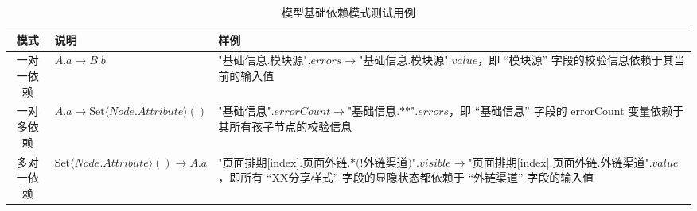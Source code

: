 \begin{table}[H]
    \centering
    \scriptsize
    \begin{tabular}{|c|p{4cm}<{\centering}|p{7cm}<{\centering}|}
        \hline
        模式       & 说明                                          & 样例                                                                                                                                                                                    \\ \hline
        一对一依赖 & $A.a\rightarrow B.b$                          & $\text{"基础信息.模块源"}.errors\rightarrow\text{"基础信息.模块源"}.value$，即 “模块源” 字段的校验信息依赖于其当前的输入值                                                              \\ \hline
        一对多依赖 & $A.a\rightarrow \text{Set}\langle Node.Attribute\rangle()$ & $\text{"基础信息"}.errorCount\rightarrow\text{"基础信息.**"}.errors$，即 “基础信息” 字段的 errorCount 变量依赖于其所有孩子节点的校验信息                                                \\ \hline
        多对一依赖 & $\text{Set}\langle Node.Attribute\rangle()\rightarrow A.a$ & $\text{"页面排期[index].页面外链.*(!外链渠道)"}.visible\rightarrow\text{"页面排期[index].页面外链.外链渠道"}.value$，即所有 “XX分享样式” 字段的显隐状态都依赖于 “外链渠道” 字段的输入值 \\ \hline
    \end{tabular}
    \normalsize
    \caption{模型基础依赖模式测试用例}
    \label{dependency-patterns}
\end{table}